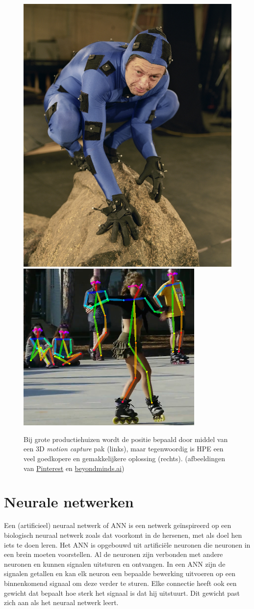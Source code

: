 \documentclass[a4paper,twoside,kulak]{kulakreport}
\begin{document}
	\begin{figure}[H]
		\includegraphics[width=.4\textwidth]{3D_motion_capture}
		\includegraphics[width=.55\textwidth]{HPE_voorbeeld}
		\caption{Bij grote productiehuizen wordt de positie bepaald door middel van een 3D \emph{motion capture} pak (links), maar tegenwoordig is HPE een veel goedkopere en gemakkelijkere oplossing (rechts).
		(afbeeldingen van \href{https://www.pinterest.com/pin/718324209297102981/}{Pinterest} en \href{https://beyondminds.ai/an-overview-of-human-pose-estimation-with-deep-learning/}{beyondminds.ai})}
		\label{3D_pak}
	\end{figure}
\section{Neurale netwerken}
Een (artificieel) neuraal netwerk of ANN is een netwerk geïnspireerd op een biologisch neuraal netwerk zoals dat voorkomt in de hersenen, met als doel hen iets te doen leren. Het ANN is opgebouwd uit artificiële neuronen die neuronen in een brein moeten voorstellen. Al de neuronen zijn verbonden met andere neuronen en kunnen signalen uitsturen en ontvangen. In een ANN zijn de signalen getallen en kan elk neuron een bepaalde bewerking uitvoeren op een binnenkomend signaal om deze verder te sturen. Elke connectie heeft ook een gewicht dat bepaalt hoe sterk het signaal is dat hij uitstuurt. Dit gewicht past zich aan als het neuraal netwerk leert. 
\end{document}
